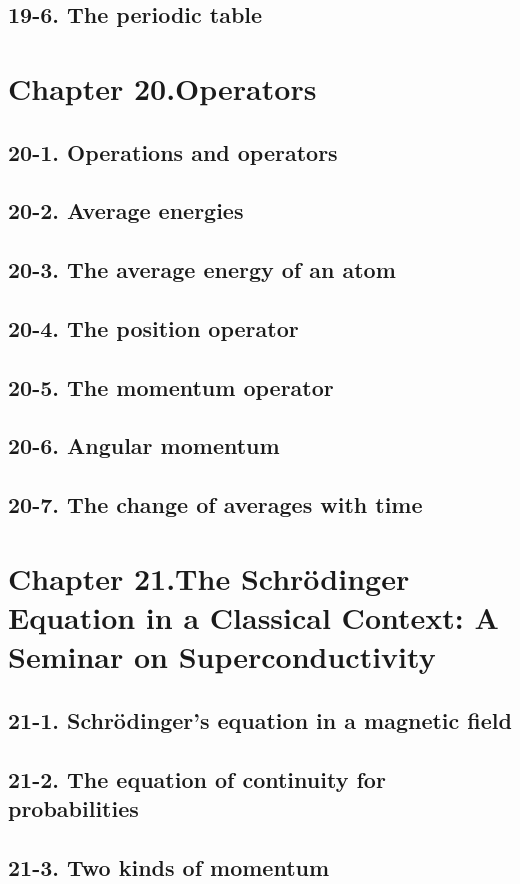 \documentclass{article}
\begin{document}
\subsection{19-6. The periodic table}
\section{Chapter 20.Operators}
\subsection{20-1. Operations and operators}
\subsection{20-2. Average energies}
\subsection{20-3. The average energy of an atom}
\subsection{20-4. The position operator}
\subsection{20-5. The momentum operator}
\subsection{20-6. Angular momentum}
\subsection{20-7. The change of averages with time}
\section{Chapter 21.The Schrödinger Equation in a Classical Context: A Seminar on Superconductivity}
\subsection{21-1. Schrödinger’s equation in a magnetic field}
\subsection{21-2. The equation of continuity for probabilities}
\subsection{21-3. Two kinds of momentum}
\end{document}
